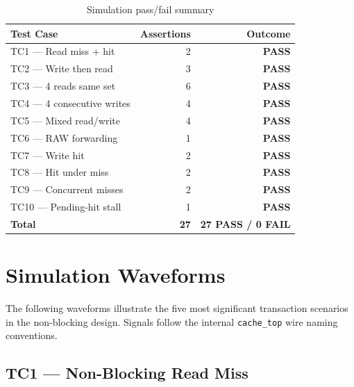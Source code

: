 \documentclass[12pt,letterpaper]{report}
\begin{document}
\begin{table}[h]
\centering
\caption{Simulation pass/fail summary}
\label{tab:sim_results}
\begin{tabular}{@{}lrr@{}}
\toprule
Test Case & Assertions & Outcome \\
\midrule
TC1  — Read miss + hit           & 2  & \textcolor{covgreen}{\textbf{PASS}} \\
TC2  — Write then read           & 3  & \textcolor{covgreen}{\textbf{PASS}} \\
TC3  — 4 reads same set          & 6  & \textcolor{covgreen}{\textbf{PASS}} \\
TC4  — 4 consecutive writes      & 4  & \textcolor{covgreen}{\textbf{PASS}} \\
TC5  — Mixed read/write          & 4  & \textcolor{covgreen}{\textbf{PASS}} \\
TC6  — RAW forwarding            & 1  & \textcolor{covgreen}{\textbf{PASS}} \\
TC7  — Write hit                 & 2  & \textcolor{covgreen}{\textbf{PASS}} \\
TC8  — Hit under miss            & 2  & \textcolor{covgreen}{\textbf{PASS}} \\
TC9  — Concurrent misses         & 2  & \textcolor{covgreen}{\textbf{PASS}} \\
TC10 — Pending-hit stall         & 1  & \textcolor{covgreen}{\textbf{PASS}} \\
\midrule
\textbf{Total}                   & \textbf{27} & \textbf{27 PASS / 0 FAIL} \\
\bottomrule
\end{tabular}
\end{table}

\section{Simulation Waveforms}

The following waveforms illustrate the five most significant
transaction scenarios in the non-blocking design.  Signals follow the
internal \texttt{cache\_top} wire naming conventions.

\subsection{TC1 — Non-Blocking Read Miss}
\end{document}
